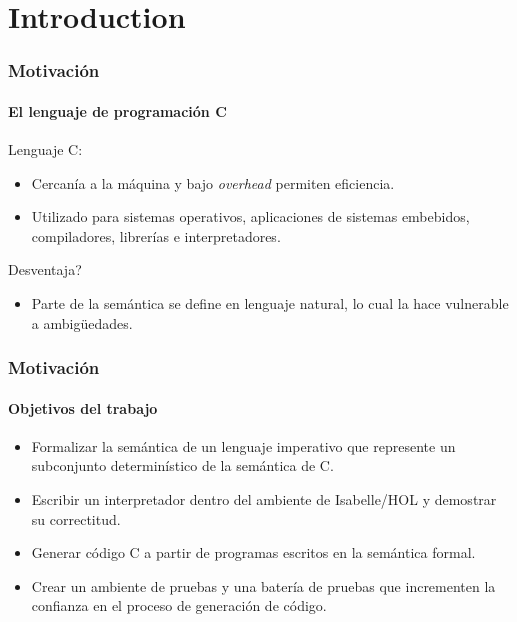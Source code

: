 \section{Introduction}

\begin{frame}
\frametitle{Motivación}
\framesubtitle{El lenguaje de programación C}

\pause

Lenguaje C:

\pause

\begin{itemize}
\item{Cercanía  a la máquina y bajo \textit{overhead} permiten eficiencia.}
\pause
\item{Utilizado para sistemas operativos, aplicaciones de sistemas embebidos, compiladores, librerías e interpretadores.}
\pause
\end{itemize}

Desventaja?
\pause
\begin{itemize}
\item{Parte de la semántica se define en lenguaje natural, lo cual la hace vulnerable a ambigüedades.}
\end{itemize}

\end{frame}


\begin{frame}
\frametitle{Motivación}
\framesubtitle{Objetivos del trabajo}

\pause
\begin{itemize}
\item{Formalizar la semántica de un lenguaje imperativo que represente un subconjunto determinístico de la semántica de C.}
\pause
\item{Escribir un interpretador dentro del ambiente de Isabelle/HOL y demostrar su correctitud.}
\pause
\item{Generar código C a partir de programas escritos en la semántica formal.}
\pause
\item{Crear un ambiente de pruebas y una batería de pruebas que incrementen la confianza en el proceso de generación de código.}
\end{itemize}

\end{frame}


